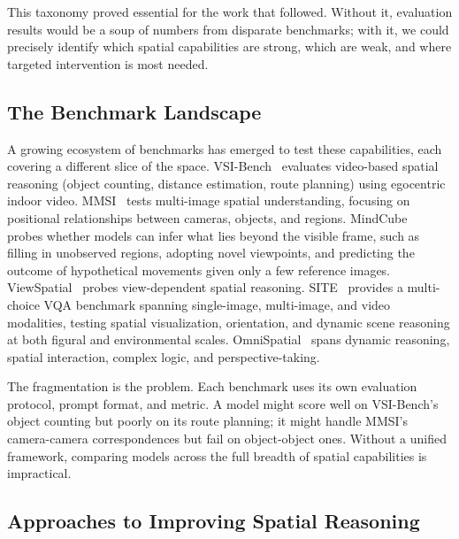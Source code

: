 \documentclass[
hf,
]{confart}
\begin{document}
This taxonomy proved essential for the work that followed. Without it, evaluation results would be a soup of numbers from disparate benchmarks; with it, we could precisely identify which spatial capabilities are strong, which are weak, and where targeted intervention is most needed.

\subsection{The Benchmark Landscape}

A growing ecosystem of benchmarks has emerged to test these capabilities, each covering a different slice of the space. VSI-Bench~\cite{yang2025thinkingspacemultimodallarge} evaluates video-based spatial reasoning (object counting, distance estimation, route planning) using egocentric indoor video. MMSI~\cite{yang2025mmsibenchbenchmarkmultiimagespatial} tests multi-image spatial understanding, focusing on positional relationships between cameras, objects, and regions. MindCube~\cite{yin2025spatialmentalmodelinglimited} probes whether models can infer what lies beyond the visible frame, such as filling in unobserved regions, adopting novel viewpoints, and predicting the outcome of hypothetical movements given only a few reference images. ViewSpatial~\cite{li2025viewspatialbenchevaluatingmultiperspectivespatial} probes view-dependent spatial reasoning. SITE~\cite{wang2025sitespatialintelligencethorough} provides a multi-choice VQA benchmark spanning single-image, multi-image, and video modalities, testing spatial visualization, orientation, and dynamic scene reasoning at both figural and environmental scales. OmniSpatial~\cite{jia2026omnispatialcomprehensivespatialreasoning} spans dynamic reasoning, spatial interaction, complex logic, and perspective-taking.

The fragmentation is the problem. Each benchmark uses its own evaluation protocol, prompt format, and metric. A model might score well on VSI-Bench's object counting but poorly on its route planning; it might handle MMSI's camera-camera correspondences but fail on object-object ones. Without a unified framework, comparing models across the full breadth of spatial capabilities is impractical.

\subsection{Approaches to Improving Spatial Reasoning}
\end{document}

